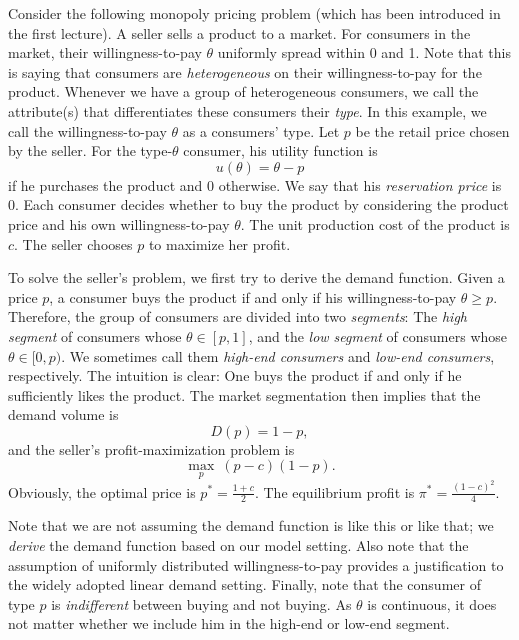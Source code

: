 \documentclass[12pt,a4paper]{article}
\begin{document}
Consider the following monopoly pricing problem (which has been introduced 
in the first lecture). A seller sells a product to a market. For consumers 
in the market, their willingness-to-pay $\theta$ uniformly spread within 0 and 1. 
Note that this is saying that consumers are \textit{heterogeneous} on 
their willingness-to-pay for the product. Whenever we have a group of 
heterogeneous consumers, we call the attribute(s) that differentiates 
these consumers their \textit{type}. In this example, 
we call the willingness-to-pay $\theta$ as a consumers' type. 
Let $p$ be the retail price chosen by the seller. 
For the type-$\theta$ consumer, his utility function is 
\[
	u(\theta) = \theta - p 
\]
if he purchases the product and 0 otherwise. 
We say that his \textit{reservation price} is 0. 
Each consumer decides whether to buy the product by considering the product 
price and his own willingness-to-pay $\theta$. 
The unit production cost of the product is $c$. 
The seller chooses $p$ to maximize her profit. 

To solve the seller's problem, we first try to derive the demand function. 
Given a price $p$, a consumer buys the product if and only if his willingness-to-pay
$\theta \geq p$. Therefore, the group of consumers are divided into two 
\textit{segments}: The \textit{high segment} of consumers 
whose $\theta \in [p, 1]$, and the \textit{low segment} of consumers
whose $\theta \in [0, p)$. We sometimes call them \textit{high-end consumers}
and \textit{low-end consumers}, respectively. 
The intuition is clear: One buys the product if and 
only if he sufficiently likes the product. 
The market segmentation then implies that the demand volume is 
\[
	D(p) = 1 - p,
\] 
and the seller's profit-maximization problem is
\[
	\max_p \ (p - c)(1 - p). 
\]
Obviously, the optimal price is $p^* = \frac{1 + c}{2}$. 
The equilibrium profit is $\pi^* = \frac{(1 - c)^2}{4}$. 

Note that we are not assuming the demand function is like this or like that; 
we \textit{derive} the demand function based on our model setting. 
Also note that the assumption of uniformly distributed willingness-to-pay
provides a justification to the widely adopted linear demand setting. 
Finally, note that the consumer of type $p$ is \textit{indifferent} between
buying and not buying. As $\theta$ is continuous, it does not matter 
whether we include him in the high-end or low-end segment. 
\end{document}
